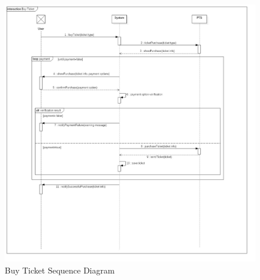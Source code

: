 \documentclass{article}
\begin{document}
\begin{figure}[H]
\includegraphics[width=\linewidth]{Buy_Ticket.jpg}
\caption{Buy Ticket Sequence Diagram}
\label{fig:SQ5}
\end{figure}
\end{document}
